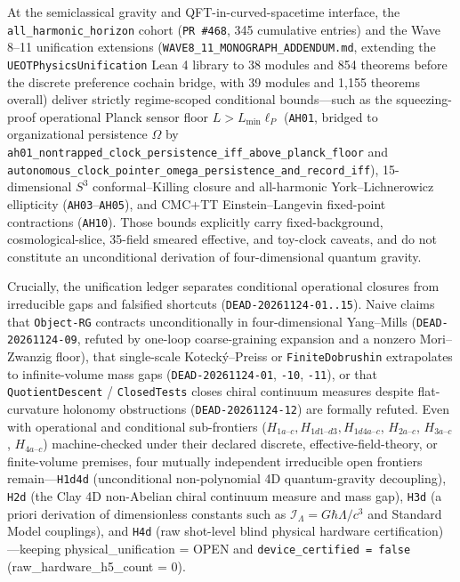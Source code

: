 \documentclass[
  english,
  11pt,
  oneside]{book}
\begin{document}
At the semiclassical gravity and QFT-in-curved-spacetime interface, the \texttt{all\_harmonic\_horizon} cohort (\texttt{PR\ \#468}, 345 cumulative entries) and the Wave 8--11 unification extensions (\nolinkurl{WAVE8_11_MONOGRAPH_ADDENDUM.md}, extending the \texttt{UEOTPhysicsUnification} Lean 4 library to 38 modules and 854 theorems before the discrete preference cochain bridge, with 39 modules and 1,155 theorems overall) deliver strictly regime-scoped conditional bounds---such as the squeezing-proof operational Planck sensor floor \(L > L_{\min}\ell_P\) (\texttt{AH01}, bridged to organizational persistence \(\Omega\) by \nolinkurl{ah01_nontrapped_clock_persistence_iff_above_planck_floor} and \nolinkurl{autonomous_clock_pointer_omega_persistence_and_record_iff}), 15-dimensional \(S^3\) conformal--Killing closure and all-harmonic York--Lichnerowicz ellipticity (\texttt{AH03}--\texttt{AH05}), and CMC+TT Einstein--Langevin fixed-point contractions (\texttt{AH10}). Those bounds explicitly carry fixed-background, cosmological-slice, 35-field smeared effective, and toy-clock caveats, and do not constitute an unconditional derivation of four-dimensional quantum gravity.

Crucially, the unification ledger separates conditional operational closures from irreducible gaps and falsified shortcuts (\texttt{DEAD-20261124-01..15}). Naive claims that \texttt{Object-RG} contracts unconditionally in four-dimensional Yang--Mills (\texttt{DEAD-20261124-09}, refuted by one-loop coarse-graining expansion and a nonzero Mori--Zwanzig floor), that single-scale Kotecký--Preiss or \texttt{FiniteDobrushin} extrapolates to infinite-volume mass gaps (\texttt{DEAD-20261124-01}, \texttt{-10}, \texttt{-11}), or that \texttt{QuotientDescent} / \texttt{ClosedTests} closes chiral continuum measures despite flat-curvature holonomy obstructions (\texttt{DEAD-20261124-12}) are formally refuted. Even with operational and conditional sub-frontiers (\(H_{1a\text{--}c}, H_{1d1\text{--}d3}, H_{1d4a\text{--}c}\), \(H_{2a\text{--}c}\), \(H_{3a\text{--}c}\), \(H_{4a\text{--}c}\)) machine-checked under their declared discrete, effective-field-theory, or finite-volume premises, four mutually independent irreducible open frontiers remain---\texttt{H1d4d} (unconditional non-polynomial 4D quantum-gravity decoupling), \texttt{H2d} (the Clay 4D non-Abelian chiral continuum measure and mass gap), \texttt{H3d} (a priori derivation of dimensionless constants such as \(\mathcal{I}_\Lambda = G\hbar\Lambda/c^3\) and Standard Model couplings), and \texttt{H4d} (raw shot-level blind physical hardware certification)---keeping physical\_unification = OPEN and \texttt{device\_certified\ =\ false} (raw\_hardware\_h5\_count = 0).
\end{document}
